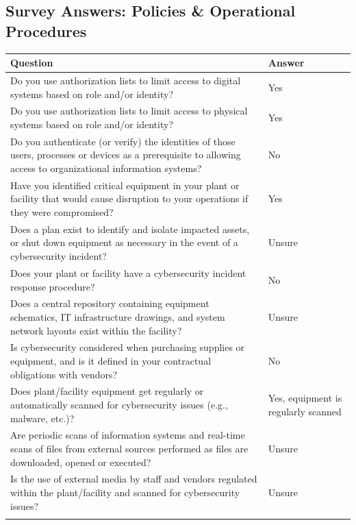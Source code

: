 \newpage

\subsection*{Survey Answers: Policies \& Operational Procedures}
\begin{table}[H]
\begin{tabularx}{\textwidth}{>{\raggedright\arraybackslash}X >{\raggedright\arraybackslash}X}
\toprule
\textbf{Question} & \textbf{Answer} \\
\midrule
Do you use authorization lists to limit access to digital systems based on role and/or identity?& Yes\\
\addlinespace
Do you use authorization lists to limit access to physical systems based on role and/or identity?& Yes\\
\addlinespace

Do you authenticate (or verify) the identities of those users, processes or devices as a prerequisite to allowing access to organizational information systems?& No\\
\addlinespace

Have you identified critical equipment in your plant or facility that would cause disruption to your operations if they were compromised?& Yes\\
\addlinespace
Does a plan exist to identify and isolate impacted assets, or shut down equipment as necessary in the event of a cybersecurity incident?& Unsure \\
\addlinespace

Does your plant or facility have a cybersecurity incident response procedure?& No \\
\addlinespace

Does a central repository containing equipment schematics, IT infrastructure drawings, and system network layouts exist within the facility?& Unsure \\ 
\addlinespace

Is cybersecurity considered when purchasing supplies or equipment, and is it defined in your contractual obligations with vendors?& No \\
\addlinespace

Does plant/facility equipment get regularly or automatically scanned for cybersecurity issues (e.g., malware, etc.)?& Yes, equipment is regularly scanned\\
\addlinespace
Are periodic scans of information systems and real-time scans of files from external sources performed as files are downloaded, opened or executed? & Unsure\\
\addlinespace
Is the use of external media by staff and vendors regulated within the plant/facility and scanned for cybersecurity issues? & Unsure \\
\addlinespace




\bottomrule
\end{tabularx}
\end{table}

